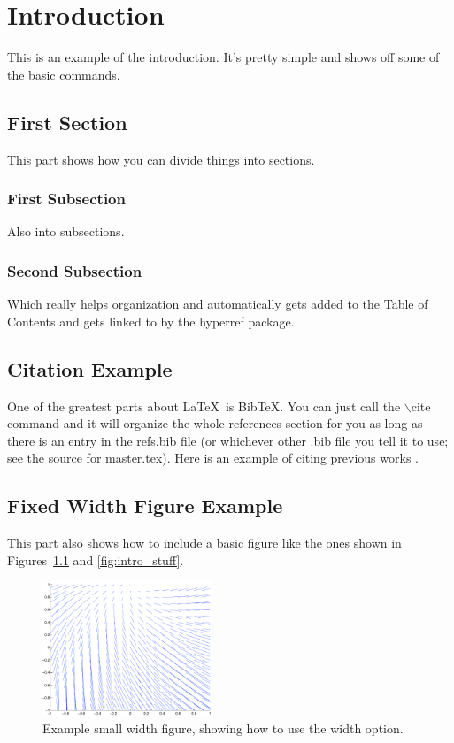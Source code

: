 \chapter{Introduction}
\label{chp:chapter1}
This is an example of the introduction. It's pretty simple and shows off
some of the basic commands.

\section{First Section}
This part shows how you can divide things into sections.

\subsection{First Subsection}
Also into subsections.

\subsection{Second Subsection}
Which really helps organization and automatically gets added to the Table
of Contents and gets linked to by the hyperref package.

\section{Citation Example}
One of the greatest parts about \LaTeX\ is BibTeX. You can just call
the $\backslash$cite command and it will organize the whole references section for you as long as there is an entry in the refs.bib file (or whichever other .bib file you tell it to use; see the source for master.tex).
Here is an example of citing previous works
\cite{guy06best,guy06second}.

\section{Fixed Width Figure Example} \label{sec:intro_figure_example}
This part also shows how to include a basic figure like the ones
shown in Figures~\ref{fig:intro_stuff2} and \ref{fig:intro_stuff}. %
\begin{figure}[t]
  \centering
  \includegraphics[width = 2in]{exampleFiles/stuff}
  \caption[Example small width figure]{
Example small width figure, showing how to use the width option.}
%
  \label{fig:intro_stuff2}
\end{figure}

